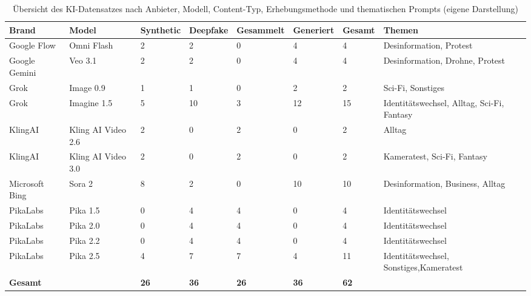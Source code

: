 \begin{table}
    \centering
    \small
    \begin{tabular}{lllllll>{\raggedright\arraybackslash}p{5cm}}\hline
         \textbf{Brand} & \textbf{Model} & \textbf{Synthetic} & \textbf{Deepfake} & \textbf{Gesammelt} & \textbf{Generiert} & \textbf{Gesamt} & \textbf{Themen} \\\hline
         Google Flow & Omni Flash & 2 & 2 & 0 & 4 & 4 & Desinformation, Protest\\\hline
         Google Gemini & Veo 3.1 & 2 & 2 & 0 & 4 & 4 & Desinformation, Drohne, Protest\\\hline
         Grok & Image 0.9 & 1 & 1 & 0 & 2 & 2 & Sci-Fi, Sonstiges\\\hline
         Grok & Imagine 1.5 & 5 & 10 & 3 & 12 & 15 & Identitätswechsel, Alltag, Sci-Fi, Fantasy\\\hline
         KlingAI & Kling AI Video 2.6 & 2 & 0 & 2 & 0 & 2 & Alltag\\\hline
         KlingAI & Kling AI Video 3.0 & 2 & 0 & 2 & 0 & 2 & Kameratest, Sci-Fi, Fantasy\\\hline
         Microsoft Bing & Sora 2 & 8 & 2 & 0 & 10 & 10 & Desinformation, Business, Alltag\\\hline
         PikaLabs & Pika 1.5 & 0 & 4 & 4 & 0 & 4 & Identitätswechsel \\\hline
         PikaLabs & Pika 2.0 & 0 & 4 & 4 & 0 & 4 & Identitätswechsel \\\hline
         PikaLabs & Pika 2.2 & 0 & 4 & 4 & 0 & 4 & Identitätswechsel \\\hline
         PikaLabs & Pika 2.5 & 4 & 7 & 7 & 4 & 11 & Identitätswechsel, Sonstiges,Kameratest\\\hline
         \textbf{Gesamt} & & \textbf{26} & \textbf{36} & \textbf{26} & \textbf{36} & \textbf{62} & \\\hline
    \end{tabular}
\caption{Übersicht des KI-Datensatzes nach Anbieter, Modell, Content-Typ, Erhebungsmethode und thematischen Prompts (eigene Darstellung)}
\label{tab:aidb}
\end{table}